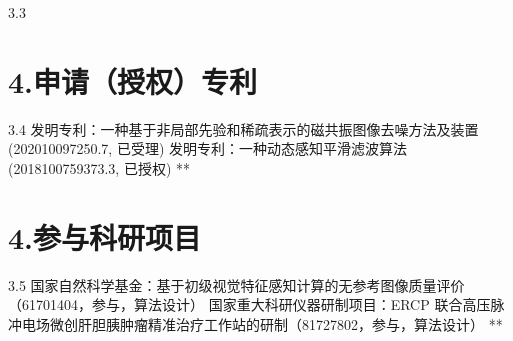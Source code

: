 \begin{results}
\begin{resultslist}{\hspace{-0.25em}3.3\hspace{0.5em}}
\end{resultslist}

\section*{4.\hspace{0.75em}申请（授权）专利}

\begin{resultslist}{\hspace{-0.25em}3.4\hspace{0.5em} }
\resultslistitem 发明专利：一种基于非局部先验和稀疏表示的磁共振图像去噪方法及装置 (202010097250.7, 已受理)
\resultslistitem  发明专利：一种动态感知平滑滤波算法 (2018100759373.3, 已授权)
\resumelistitem ***

\end{resultslist}

\section*{4.\hspace{0.75em}参与科研项目}
\begin{resultslist}{\hspace{-0.25em}3.5\hspace{0.5em}}
\resultslistitem 国家自然科学基金：基于初级视觉特征感知计算的无参考图像质量评价（61701404，参与，算法设计）
\resultslistitem 国家重大科研仪器研制项目：ERCP 联合高压脉冲电场微创肝胆胰肿瘤精准治疗工作站的研制（81727802，参与，算法设计）
\resumelistitem ***
\end{resultslist}

\end{results}

